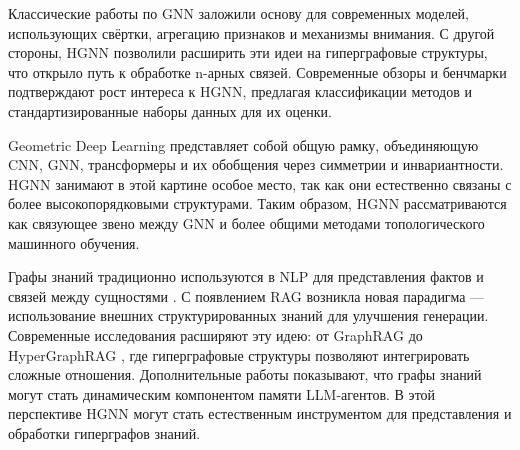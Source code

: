 \documentclass{article}
\begin{document}
Классические работы по GNN \citep{kipf2017gnn,hamilton2017sage,velickovic2018gat} заложили основу для современных моделей, использующих свёртки, агрегацию признаков и механизмы внимания. С другой стороны, HGNN \citep{feng2019hgnn} позволили расширить эти идеи на гиперграфовые структуры, что открыло путь к обработке n-арных связей. Современные обзоры \citep{yang2025survey} и бенчмарки \citep{li2025benchmarks} подтверждают рост интереса к HGNN, предлагая классификации методов и стандартизированные наборы данных для их оценки.

Geometric Deep Learning \citep{bronstein2021gdl} представляет собой общую рамку, объединяющую CNN, GNN, трансформеры и их обобщения через симметрии и инвариантности. HGNN занимают в этой картине особое место, так как они естественно связаны с более высокопорядковыми структурами. Таким образом, HGNN рассматриваются как связующее звено между GNN и более общими методами топологического машинного обучения.

Графы знаний традиционно используются в NLP для представления фактов и связей между сущностями \citep{hogan2021kg}. С появлением RAG \citep{lewis2020rag} возникла новая парадигма — использование внешних структурированных знаний для улучшения генерации. Современные исследования расширяют эту идею: от GraphRAG \citep{han2025graphrag} до HyperGraphRAG \citep{luo2025hypergraphrag}, где гиперграфовые структуры позволяют интегрировать сложные отношения. Дополнительные работы \citep{wu2024memory,rasmussen2025dynamic,anokhin2024agents} показывают, что графы знаний могут стать динамическим компонентом памяти LLM-агентов. В этой перспективе HGNN могут стать естественным инструментом для представления и обработки гиперграфов знаний.



\end{document}
